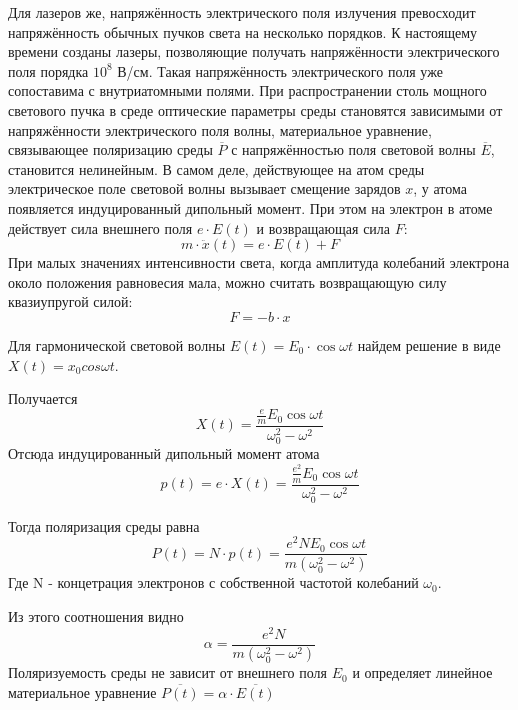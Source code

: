 \documentclass[a4paper,12pt]{article} %
\begin{document}
Для лазеров же, напряжённость электрического поля излучения превосходит напряжённость обычных пучков света на несколько порядков. К настоящему времени созданы лазеры, позволяющие получать напряжённости электрического поля порядка $10^8$ В/см. Такая напряжённость электрического поля уже сопоставима с внутриатомными полями. При распространении столь мощного светового пучка в среде оптические параметры среды становятся зависимыми от напряжённости электрического поля волны, материальное уравнение, связывающее поляризацию среды $\overline{P}$ с напряжённостью поля световой волны $\overline{E}$, становится нелинейным. В самом деле, действующее на атом среды электрическое поле световой волны вызывает смещение зарядов $x$, у атома появляется индуцированный дипольный момент. При этом на электрон в атоме действует сила внешнего поля $e \cdot E(t)$ и возвращающая сила $F$:
\begin{equation}
m \cdot \ddot{x}(t) = e \cdot E(t) + F
\end{equation}
При малых значениях интенсивности света, когда амплитуда колебаний электрона около положения равновесия мала, можно считать возвращающую силу квазиупругой силой:
\begin{equation}
F = -b \cdot x
\label{upr}
\end{equation}

Для гармонической световой волны $E(t) = E_0 \cdot \cos \omega t$ найдем решение в виде $X(t) = x_0 cos \omega t$.

Получается
\begin{equation}
X(t) = \frac{\frac{e}{m} E_0 \cos \omega t}{\omega^2_0 - \omega^2}
\end{equation}
Отсюда индуцированный дипольный момент атома
\begin{equation}
p(t) = e \cdot X(t) = \frac{\frac{e^2}{m} E_0 \cos \omega t}{\omega^2_0 - \omega^2}
\end{equation}

Тогда поляризация среды равна
\begin{equation}
P(t) = N \cdot p(t) = \frac{e^2 N E_0 \cos \omega t}{m(\omega^2_0 - \omega^2)}
\end{equation}
Где N - концетрация электронов с собственной частотой колебаний $\omega_0$.

Из этого соотношения видно
\begin{equation}
\alpha = \frac{e^2 N}{m(\omega^2_0 - \omega^2)}
\end{equation}
Поляризуемость среды не зависит от внешнего поля $E_0$ и определяет линейное материальное уравнение $\overline{P(t)} = \alpha \cdot \overline{E(t)}$
\end{document}

